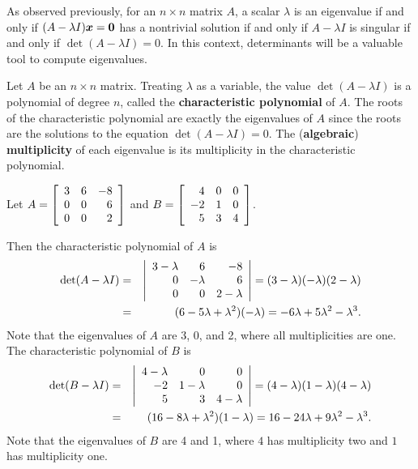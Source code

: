 As observed previously, for an $n\times n$ matrix $A$, a scalar $\lambda$ is an eigenvalue if and only if $(A-\lambda I)\bb x = \bb 0$ has a nontrivial solution if and only if $A-\lambda I$ is singular if and only if $\det(A-\lambda I) = 0$. In this context, determinants will be a valuable tool to compute eigenvalues.\\

\begin{Def} Let $A$ be an $n\times n$ matrix. Treating $\lambda$ as a variable, the value $\det(A-\lambda I)$ is a polynomial of degree $n$, called the \textbf{characteristic polynomial} of $A$. The roots of the characteristic polynomial are exactly the eigenvalues of $A$ since the roots are the solutions to the equation $\det(A-\lambda I)=0$. The (\textbf{algebraic}) \textbf{multiplicity} of each eigenvalue is its multiplicity in the characteristic polynomial.
\end{Def}\vs

\begin{Exam} Let $A = \mtx{rrr}{3&6&-8\\0&0&6\\0&0&2}$ and $B = \mtx{rrr}{4&0&0\\-2&1&0\\5&3&4}$.

Then the characteristic polynomial of $A$ is  
\begin{eqnarray*}
\det(A-\lambda I) &=&  \dtx{rrr}{3-\lambda&6&-8\\0&-\lambda&6\\0&0&2-\lambda} = (3-\lambda)(-\lambda)(2-\lambda)\\
&=& (6-5\lambda+\lambda^2)(-\lambda) = -6\lambda + 5\lambda^2 - \lambda^3.
\end{eqnarray*} Note that the eigenvalues of $A$ are 3, 0, and 2, where all multiplicities are one.\\

The characteristic polynomial of $B$ is 
\begin{eqnarray*}
\det(B-\lambda I) &=&  \dtx{rrr}{4-\lambda&0&0\\-2&1-\lambda&0\\5&3&4-\lambda} = (4-\lambda)(1-\lambda)(4-\lambda)\\
&=& (16-8\lambda+\lambda^2)(1-\lambda) = 16-24\lambda +9\lambda^2 -\lambda^3.
\end{eqnarray*} Note that the eigenvalues of $B$ are 4 and 1, where $4$ has multiplicity two and $1$ has multiplicity one.
\end{Exam}\vs

